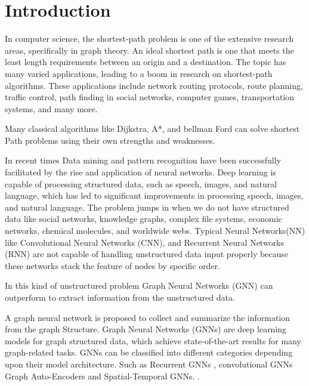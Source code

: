 \documentclass{article}
\begin{document}
\section{Introduction}
In computer science, the shortest-path problem is one of the extensive research areas, speciﬁcally in graph theory. An ideal shortest path is one that meets the least length requirements between an origin and a destination. The topic has many varied applications, leading to a boom in research on shortest-path algorithms. These applications include network routing protocols, route planning, traﬃc control, path ﬁnding in social networks, computer games, transportation systems, and many more. \cite{DBLP:journals/corr/MadkourARRB17}

Many classical algorithms like Dijkstra, A*, and bellman Ford can solve shortest Path problems using their own strengths and weaknesses.

In recent times Data mining and pattern recognition have been successfully facilitated by the rise and application of neural networks. Deep learning is capable of processing structured data, such as speech, images, and natural language, which has led to significant improvements in processing speech, images, and natural language. The problem jumps in when we do not have structured data like social networks, knowledge graphs, complex file systems, economic networks, chemical molecules, and worldwide webs. Typical Neural Networks(NN) like Convolutional Neural Networks (CNN), and Recurrent Neural Networks (RNN) are not capable of handling unstructured data input properly because these networks stack the feature of nodes by specific order. \cite{Mendoza_2019}

In this kind of unstructured problem Graph Neural Networks (GNN) can outperform to extract information from the unstructured data.

A graph neural network is proposed to collect and summarize the information from the graph Structure. \cite{DBLP:journals/corr/abs-1812-04202}
Graph Neural Networks (GNNs)  are deep learning models for graph structured data, which achieve state-of-the-art results for many graph-related tasks.\cite{data7010010}
GNNs can be classified into different categories depending upon their model architecture. \cite{DBLP:journals/corr/abs-1901-00596}
Such as Recurrent GNNs \cite{inproceedings}, convolutional GNNs \cite{DBLP:journals/corr/HamiltonYL17}
\cite{DBLP:journals/corr/KipfW16}
Graph Auto-Encoders \cite{https://doi.org/10.48550/arxiv.1611.07308}
and Spatial-Temporal GNNs. \cite{Yan_Xiong_Lin_2018}.
\printbibliography

\end{document}
